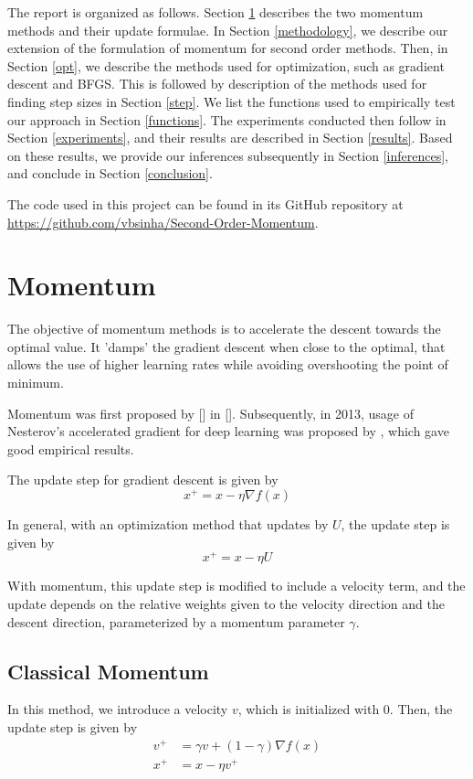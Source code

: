 \documentclass{article}
\begin{document}
The report is organized as follows. Section \ref{momentum} describes the two momentum methods and their update formulae. In Section \ref{methodology}, we describe our extension of the formulation of momentum for second order methods. Then, in Section \ref{opt}, we describe the methods used for optimization, such as gradient descent and BFGS. This is followed by description of the methods used for finding step sizes in Section \ref{step}. We list the functions used to empirically test our approach in Section \ref{functions}. The experiments conducted then follow in Section \ref{experiments}, and their results are described in Section \ref{results}. Based on these results, we provide our inferences subsequently in Section \ref{inferences}, and conclude in Section \ref{conclusion}.

The code used in this project can be found in its GitHub repository at \url{https://github.com/vbsinha/Second-Order-Momentum}.

\section{Momentum}\label{momentum}

The objective of momentum methods is to accelerate the descent towards the optimal value. It 'damps' the gradient descent when close to the optimal, that allows the use of higher learning rates while avoiding overshooting the point of minimum.

Momentum was first proposed by [] in []. Subsequently, in 2013, usage of Nesterov's accelerated gradient for deep learning was proposed by \citet{Sutskever}, which gave good empirical results.

The update step for gradient descent is given by
\begin{equation}
x^+ = x - \eta \nabla f(x)
\end{equation}

In general, with an optimization method that updates by $U$, the update step is given by
\begin{equation}
x^+ = x - \eta U
\end{equation}

With momentum, this update step is modified to include a velocity term, and the update depends on the relative weights given to the velocity direction and the descent direction, parameterized by a momentum parameter $\gamma$.

\subsection{Classical Momentum}
In this method, we introduce a velocity $v$, which is initialized with $0$. Then, the update step is given by
\begin{align}
v^+ &= \gamma v + (1-\gamma) \nabla f(x) \\
x^+ &= x - \eta v^+
\end{align}
\end{document}
